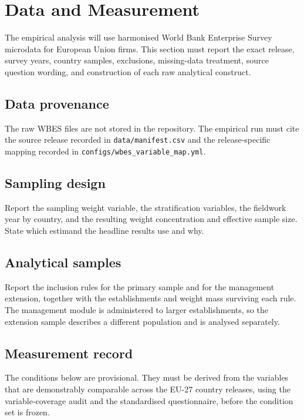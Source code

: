 \section{Data and Measurement}

The empirical analysis will use harmonised World Bank Enterprise Survey
microdata for European Union firms. This section must report the exact release,
survey years, country samples, exclusions, missing-data treatment, source
question wording, and construction of each raw analytical construct.

\subsection{Data provenance}

The raw WBES files are not stored in the repository. The empirical run must cite
the source release recorded in \texttt{data/manifest.csv} and the
release-specific mapping recorded in \texttt{configs/wbes\_variable\_map.yml}.

\subsection{Sampling design}

Report the sampling weight variable, the stratification variables, the fieldwork
year by country, and the resulting weight concentration and effective sample
size. State which estimand the headline results use and why.

\subsection{Analytical samples}

Report the inclusion rules for the primary sample and for the management
extension, together with the establishments and weight mass surviving each rule.
The management module is administered to larger establishments, so the extension
sample describes a different population and is analysed separately.

\subsection{Measurement record}

The conditions below are provisional. They must be derived from the variables
that are demonstrably comparable across the EU-27 country releases, using the
variable-coverage audit and the standardised questionnaire, before the condition
set is frozen.

